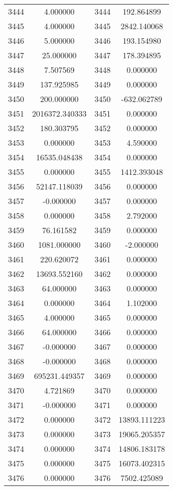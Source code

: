 \documentclass[12pt]{article}
\begin{document}
\begin{longtable}{@{}cccc@{}}
3444 & 4.000000 & 3444 & 192.864899 \\
3445 & 4.000000 & 3445 & 2842.140068 \\
3446 & 5.000000 & 3446 & 193.154980 \\
3447 & 25.000000 & 3447 & 178.394895 \\
3448 & 7.507569 & 3448 & 0.000000 \\
3449 & 137.925985 & 3449 & 0.000000 \\
3450 & 200.000000 & 3450 & -632.062789 \\
3451 & 2016372.340333 & 3451 & 0.000000 \\
3452 & 180.303795 & 3452 & 0.000000 \\
3453 & 0.000000 & 3453 & 4.590000 \\
3454 & 16535.048438 & 3454 & 0.000000 \\
3455 & 0.000000 & 3455 & 1412.393048 \\
3456 & 52147.118039 & 3456 & 0.000000 \\
3457 & -0.000000 & 3457 & 0.000000 \\
3458 & 0.000000 & 3458 & 2.792000 \\
3459 & 76.161582 & 3459 & 0.000000 \\
3460 & 1081.000000 & 3460 & -2.000000 \\
3461 & 220.620072 & 3461 & 0.000000 \\
3462 & 13693.552160 & 3462 & 0.000000 \\
3463 & 64.000000 & 3463 & 0.000000 \\
3464 & 0.000000 & 3464 & 1.102000 \\
3465 & 4.000000 & 3465 & 0.000000 \\
3466 & 64.000000 & 3466 & 0.000000 \\
3467 & -0.000000 & 3467 & 0.000000 \\
3468 & -0.000000 & 3468 & 0.000000 \\
3469 & 695231.449357 & 3469 & 0.000000 \\
3470 & 4.721869 & 3470 & 0.000000 \\
3471 & -0.000000 & 3471 & 0.000000 \\
3472 & 0.000000 & 3472 & 13893.111223 \\
3473 & 0.000000 & 3473 & 19065.205357 \\
3474 & 0.000000 & 3474 & 14806.183178 \\
3475 & 0.000000 & 3475 & 16073.402315 \\
3476 & 0.000000 & 3476 & 7502.425089 \\

\end{longtable}
\end{document}
